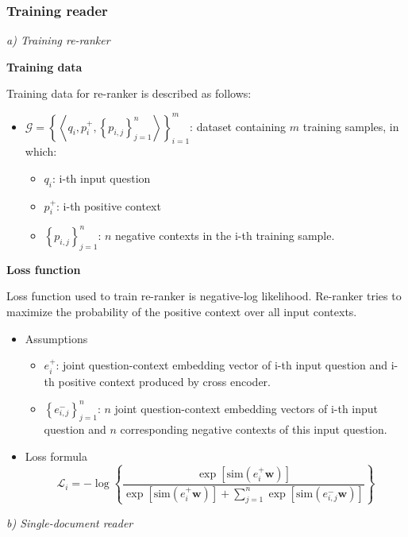 \documentclass[12pt, sort&compress]{report}
\begin{document}
\subsubsection{Training reader}
\par \textit{a) Training re-ranker}
\par \textbf{Training data}
\par Training data for re-ranker is described as follows:
\begin{itemize}
	\item 
	$\mathcal{G} = \left\{\left\langle q_i, p_i^+, \left\{p_{i, j}\right\}_{j=1}^n\right\rangle\right\}_{i=1}^m$: dataset containing $m$ training samples, in which:
	\begin{itemize}
		\item $q_i$: i-th input question
		\item $p_i^+$: i-th positive context
		\item $\left\{p_{i,j}\right\}_{j=1}^n$: $n$ negative contexts in the i-th training sample.
	\end{itemize}
\end{itemize}
\par \textbf{Loss function}
\par Loss function used to train re-ranker is negative-log likelihood. Re-ranker tries to maximize the probability of the positive context over all input contexts. 
\begin{itemize}
	\item Assumptions
	\begin{itemize}
		\item $e_i^+$: joint question-context embedding vector of i-th input question and i-th positive context produced by cross encoder.
		\item $\left\{e_{i, j}^-\right\}_{j=1}^n$: $n$ joint question-context embedding vectors of i-th input question and $n$ corresponding negative contexts of this input question. 
	\end{itemize}
	\item Loss formula \\[10pt]
	\begin{equation}
		\label{eq:04}
		\mathcal{L}_i =-\log\left\{ \dfrac{\exp\left[\text{sim}\left(e^+_i\mathbf{w}\right)\right]}{\exp\left[\text{sim}\left(e^+_i\mathbf{w}\right)\right] + \sum\limits_{j=1}^n\exp\left[\text{sim}\left(e^-_{i,j}\mathbf{w}\right)\right]}\right\}
	\end{equation}
\end{itemize}
\par \textit{b) Single-document reader}
\end{document}
